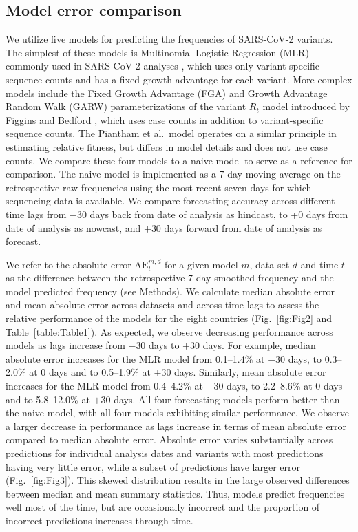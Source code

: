 \subsection*{Model error comparison}


We utilize five models for predicting the frequencies of SARS-CoV-2 variants.
The simplest of these models is Multinomial Logistic Regression (MLR) commonly used in SARS-CoV-2 analyses \cite{annavajhala2021emergence, faria2021genomics, obermeyer2022analysis, susswein2023early}, which uses only variant-specific sequence counts and has a fixed growth advantage for each variant.
More complex models include the Fixed Growth Advantage (FGA) and Growth Advantage Random Walk (GARW) parameterizations of the variant $R_t$ model introduced by Figgins and Bedford \cite{Figgins2021}, which uses case counts in addition to variant-specific sequence counts.
The Piantham et al.\ model \cite{piantham2021estimating} operates on a similar principle in estimating relative fitness, but differs in model details and does not use case counts.
We compare these four models to a naive model to serve as a reference for comparison.
The naive model is implemented as a 7-day moving average on the retrospective raw frequencies using the most recent seven days for which sequencing data is available.
We compare forecasting accuracy across different time lags from $-30$ days back from date of analysis as hindcast, to +0 days from date of analysis as nowcast, and $+30$ days forward from date of analysis as forecast.


We refer to the absolute error $\mathrm{AE}_{t}^{m,d}$ for a given model $m$, data set $d$ and time $t$ as the difference between the retrospective 7-day smoothed frequency and the model predicted frequency (see Methods).
We calculate median absolute error and mean absolute error across datasets and across time lags to assess the relative performance of the models for the eight countries (Fig.~\ref{fig:Fig2} and Table~\ref{table:Table1}).
As expected, we observe decreasing performance across models as lags increase from $-30$ days to $+30$ days.
For example, median absolute error increases for the MLR model from 0.1--1.4\% at $-30$ days, to 0.3--2.0\% at 0 days and to 0.5--1.9\% at $+30$ days.
Similarly, mean absolute error increases for the MLR model from 0.4--4.2\% at $-30$ days, to 2.2--8.6\% at 0 days and to 5.8--12.0\% at $+30$ days.
All four forecasting models perform better than the naive model, with all four models exhibiting similar performance.
We observe a larger decrease in performance as lags increase in terms of mean absolute error compared to median absolute error.
Absolute error varies substantially across predictions for individual analysis dates and variants with most predictions having very little error, while a subset of predictions have larger error (Fig.~\ref{fig:Fig3}).
This skewed distribution results in the large observed differences between median and mean summary statistics.
Thus, models predict frequencies well most of the time, but are occasionally incorrect and the proportion of incorrect predictions increases through time.

